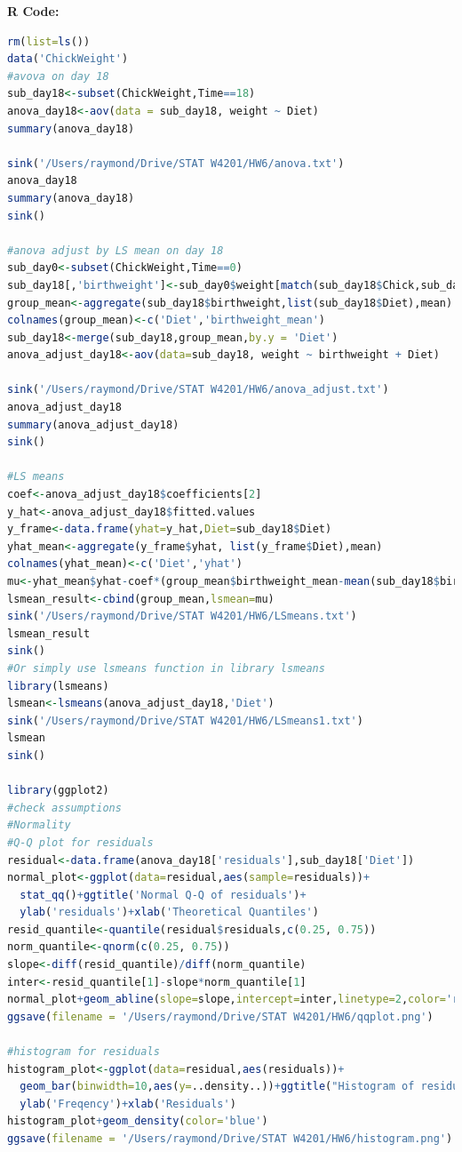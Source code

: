\documentclass[10pt,letterpaper]{article}
\begin{document}
\newpage
\textbf{R Code:}
\begin{lstlisting}[language=R]
rm(list=ls())
data('ChickWeight')
#avova on day 18
sub_day18<-subset(ChickWeight,Time==18)
anova_day18<-aov(data = sub_day18, weight ~ Diet)
summary(anova_day18)

sink('/Users/raymond/Drive/STAT W4201/HW6/anova.txt')
anova_day18
summary(anova_day18)
sink()

#anova adjust by LS mean on day 18
sub_day0<-subset(ChickWeight,Time==0)
sub_day18[,'birthweight']<-sub_day0$weight[match(sub_day18$Chick,sub_day0$Chick)]
group_mean<-aggregate(sub_day18$birthweight,list(sub_day18$Diet),mean)
colnames(group_mean)<-c('Diet','birthweight_mean')
sub_day18<-merge(sub_day18,group_mean,by.y = 'Diet')
anova_adjust_day18<-aov(data=sub_day18, weight ~ birthweight + Diet)

sink('/Users/raymond/Drive/STAT W4201/HW6/anova_adjust.txt')
anova_adjust_day18
summary(anova_adjust_day18)
sink()

#LS means
coef<-anova_adjust_day18$coefficients[2]
y_hat<-anova_adjust_day18$fitted.values
y_frame<-data.frame(yhat=y_hat,Diet=sub_day18$Diet)
yhat_mean<-aggregate(y_frame$yhat, list(y_frame$Diet),mean)
colnames(yhat_mean)<-c('Diet','yhat')
mu<-yhat_mean$yhat-coef*(group_mean$birthweight_mean-mean(sub_day18$birthweight))
lsmean_result<-cbind(group_mean,lsmean=mu)
sink('/Users/raymond/Drive/STAT W4201/HW6/LSmeans.txt')
lsmean_result
sink()
#Or simply use lsmeans function in library lsmeans
library(lsmeans)
lsmean<-lsmeans(anova_adjust_day18,'Diet')
sink('/Users/raymond/Drive/STAT W4201/HW6/LSmeans1.txt')
lsmean
sink()

library(ggplot2)
#check assumptions
#Normality
#Q-Q plot for residuals
residual<-data.frame(anova_day18['residuals'],sub_day18['Diet'])
normal_plot<-ggplot(data=residual,aes(sample=residuals))+
  stat_qq()+ggtitle('Normal Q-Q of residuals')+
  ylab('residuals')+xlab('Theoretical Quantiles')
resid_quantile<-quantile(residual$residuals,c(0.25, 0.75))
norm_quantile<-qnorm(c(0.25, 0.75))
slope<-diff(resid_quantile)/diff(norm_quantile)
inter<-resid_quantile[1]-slope*norm_quantile[1]
normal_plot+geom_abline(slope=slope,intercept=inter,linetype=2,color='red')
ggsave(filename = '/Users/raymond/Drive/STAT W4201/HW6/qqplot.png')

#histogram for residuals
histogram_plot<-ggplot(data=residual,aes(residuals))+
  geom_bar(binwidth=10,aes(y=..density..))+ggtitle("Histogram of residuals")+
  ylab('Freqency')+xlab('Residuals')
histogram_plot+geom_density(color='blue')
ggsave(filename = '/Users/raymond/Drive/STAT W4201/HW6/histogram.png')


\end{lstlisting}
\end{document}
